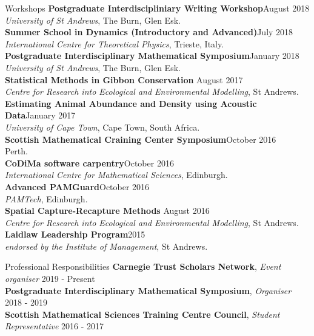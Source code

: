 \documentclass{resume} %
\begin{document}
\begin{rSection}{Workshops} \itemsep -3pt  
{\textbf{Postgraduate Interdiscipliniary Writing Workshop}}\hfill August 2018\\ \emph{University of St Andrews}, The Burn, Glen Esk.  \\ 
{\textbf{Summer School in Dynamics (Introductory and Advanced)}}\hfill July 2018\\ \emph{International Centre for Theoretical Physics}, Trieste, Italy.  \\ 
{\textbf{Postgraduate Interdisciplinary Mathematical Symposium}}\hfill January 2018\\ \emph{University of St Andrews}, The Burn, Glen Esk.  \\ 
{\textbf{Statistical Methods in Gibbon Conservation}} \hfill August 2017\\ \emph{Centre for Research into Ecological and Environmental Modelling}, {St Andrews.} \\ 
{\textbf{Estimating Animal Abundance and Density using Acoustic Data}}\hfill January 2017\\ \emph{University of Cape Town}, Cape Town, South Africa.  \\ 
{\textbf{Scottish Mathematical Craining Center Symposium}\hfill October 2016\\  {Perth.}} \\
{\textbf{CoDiMa software carpentry}}\hfill October 2016 \\ \emph{International Centre for Mathematical Sciences}, Edinburgh. \\
{\textbf{Advanced PAMGuard}}\hfill October 2016\\ \emph{PAMTech}, {Edinburgh.}  \\
{\textbf{Spatial Capture-Recapture Methods} \hfill August 2016\\ \emph{Centre for Research into Ecological and Environmental Modelling}, {St Andrews.}} \\
\textbf{Laidlaw Leadership Program}\hfill 2015\\ \emph{endorsed by the Institute of Management}, St Andrews.
\end{rSection}  


\begin{rSection}{Professional Responsibilities}
\textbf{Carnegie Trust Scholars Network}, \emph{Event organiser} \hfill 2019 - Present\\
\textbf{Postgraduate Interdisciplinary Mathematical Symposium}, \emph{Organiser} \hfill 2018 - 2019\\
\textbf{Scottish Mathematical Sciences Training Centre Council}, \emph{Student Representative} \hfill 2016 - 2017\\
\end{rSection}
\end{document}
